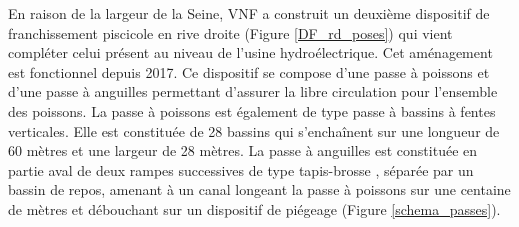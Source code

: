\documentclass[11pt,titlepage,twoside]{article}\usepackage[]{graphicx}\usepackage[table]{xcolor}
\begin{document}
En raison de la largeur de la Seine, VNF a construit un deuxième dispositif de franchissement piscicole en rive droite (Figure \ref{DF_rd_poses}) qui vient compléter celui présent au niveau de l'usine hydroélectrique. Cet aménagement est fonctionnel depuis 2017.
Ce dispositif se compose d'une passe à poissons et d'une passe à anguilles permettant d'assurer la libre circulation pour l'ensemble des poissons. La passe à poissons est également de type passe à bassins à fentes verticales. Elle est constituée de 28 bassins qui s'enchaînent sur une longueur de 60 mètres et une largeur de 28 mètres. La passe à anguilles est constituée en partie aval de deux rampes successives de type \og tapis-brosse \fg{}, séparée par un bassin de repos, amenant à un canal longeant la passe à poissons sur une centaine de mètres et débouchant sur un dispositif de piégeage (Figure \ref{schema_passes}).
\end{document}
